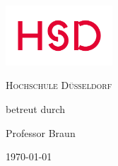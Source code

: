 \begin{titlepage}
	\centering
	\includegraphics[width=0.30\textwidth]{hsd-logo}\par\vspace{1cm}
	{\scshape\LARGE Hochschule Düsseldorf\par}
	\vfill
	{\scshape\Large \docUeberTitel \par}
	\vfill
	{\huge\bfseries \docTitel \par}
	\vfill
	
	{\Large\itshape \docAutor \par}
	\vfill
	betreut durch\par
	Professor Braun
	\vfill
	{\large \today\par}
\end{titlepage}